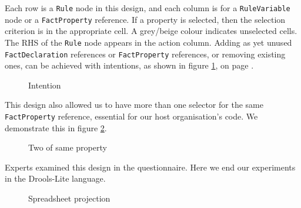 Each row is a \texttt{Rule} node in this design, and each column is for a \texttt{RuleVariable} node or a \texttt{FactProperty} reference.
If a property is selected, then the selection criterion is in the appropriate cell.
A grey/beige colour indicates unselected cells.
The RHS of the \texttt{Rule} node appears in the action column.
Adding as yet unused \texttt{FactDeclaration} references or \texttt{FactProperty} references, or removing existing ones, can be achieved with intentions, as shown in figure \ref{fig:SpreadsheetIntentions}, on page \pageref{fig:SpreadsheetIntentions}.

\begin{figure}[h]
    \centering
    \caption{Intention}
    \label{fig:SpreadsheetIntentions}
\end{figure}

This design also allowed us to have more than one selector for the same \texttt{FactProperty} reference, essential for our host organisation's code.
We demonstrate this in figure \ref{fig:TwoProperties}.

\begin{figure}[h]
    \centering
    \caption{Two of same property}
    \label{fig:TwoProperties}
\end{figure}

Experts examined this design in the questionnaire. 
Here we end our experiments in the Drools-Lite language.

\begin{figure}
    \centering
    \caption{Spreadsheet projection}
    \label{fig:SpreadsheetProjection}
\end{figure}

